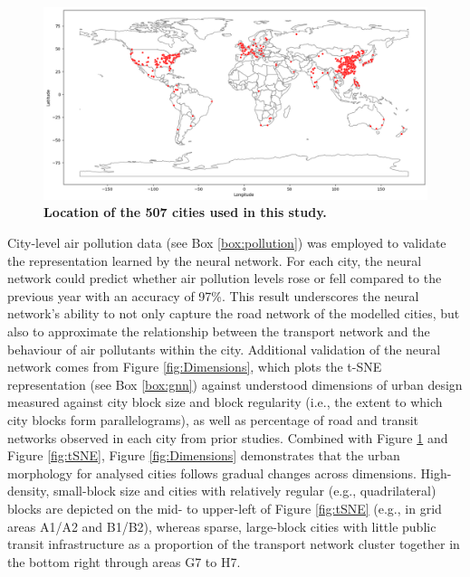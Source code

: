 \documentclass[preprint,10pt]{elsarticle} %
\begin{document}
\begin{figure}
\centering
\includegraphics[trim={0 0 0 0},clip,scale=0.4]{Images/ByCountry_map_Black.png}
\caption{\bf Location of the 507 cities used in this study.}
 \label{fig:clusters}
\end{figure}

City-level air pollution data (see Box \ref{box:pollution}) was employed to validate the representation learned by the neural network. For each city, the neural network could predict whether air pollution levels rose or fell compared to the previous year with an accuracy of 97\%. This result underscores the neural network's ability to not only capture the road network of the modelled cities, but also to approximate the relationship between the transport network and the behaviour of air pollutants within the city. Additional validation of the neural network comes from Figure \ref{fig:Dimensions}, which plots the t-SNE representation (see Box \ref{box:gnn}) against understood dimensions of urban design measured against city block size and block regularity (i.e., the extent to which city blocks form parallelograms), as well as percentage of road and transit networks observed in each city from prior studies\cite{Thompson2020,Nice2019b}. Combined with Figure \ref{fig:clusters} and Figure \ref{fig:tSNE}, Figure \ref{fig:Dimensions} demonstrates that the urban morphology for analysed cities follows gradual changes across dimensions. High-density, small-block size and cities with relatively regular (e.g., quadrilateral) blocks are depicted on the mid- to upper-left of Figure \ref{fig:tSNE} (e.g., in grid areas A1/A2 and B1/B2), whereas sparse, large-block cities with little public transit infrastructure as a proportion of the transport network cluster together in the bottom right through areas G7 to H7. 
\end{document}
